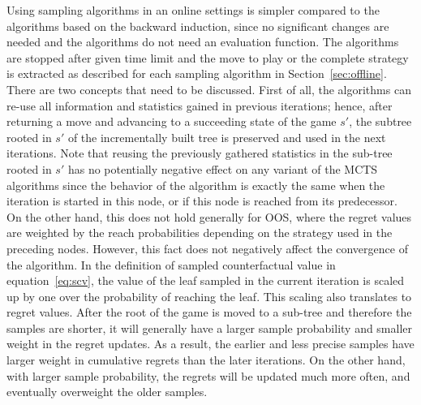 Using sampling algorithms in an online settings is simpler compared to the algorithms based on the backward induction, since no significant changes are needed and the algorithms do not need an evaluation function.
The algorithms are stopped after given time limit and the move to play or the complete strategy is extracted as described for each sampling algorithm in Section~\ref{sec:offline}.
There are two concepts that need to be discussed. 
First of all, the algorithms can re-use all information and statistics gained in previous iterations; hence, after returning a move and advancing to a succeeding state of the game $s'$, the subtree rooted in $s'$ of the incrementally built tree is preserved and used in the next iterations. 
Note that reusing the previously gathered statistics in the sub-tree rooted in $s'$ has no potentially negative effect on any variant of the MCTS algorithms since the behavior of the algorithm is exactly the same when the iteration is started in this node, or if this node is reached from its predecessor. On the other hand, this does not hold generally for OOS, where the regret values are weighted by the reach probabilities depending on the strategy used in the preceding nodes.  However, this fact does not negatively affect the convergence of the algorithm. In the definition of sampled counterfactual value in equation~\ref{eq:scv}, the value of the leaf sampled in the current iteration is scaled up by one over the probability of reaching the leaf. This scaling also translates to regret values. After the root of the game is moved to a sub-tree and therefore the samples are shorter, it will generally have a larger sample probability and smaller weight in the regret updates. As a result, the earlier and less precise samples have larger weight in cumulative regrets than the later iterations. On the other hand, with larger sample probability, the regrets will be updated much more often, and eventually overweight the older samples.

